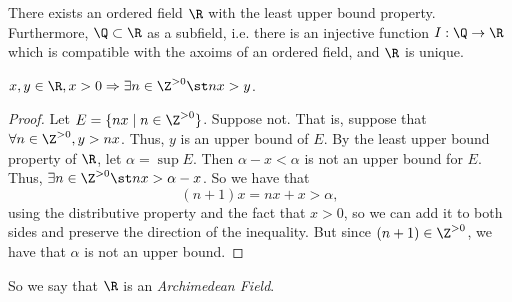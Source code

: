 \documentclass{notes}
\begin{document}
\begin{theorem}
  There exists an ordered field $\R$ with the least upper bound property. Furthermore, $\Q\subset\R$
  as a subfield, i.e. there is an injective function $I:\Q\to\R$ which is compatible with the axoims
  of an ordered field, and $\R$ is unique.
\end{theorem}

\begin{theorem}
  $x,y\in\R, x > 0 \Rightarrow \exists n\in\Z^{>0} \st nx > y$.
\end{theorem}
\begin{proof}
  Let $E = \{nx\mid n\in\Z^{>0}\}$. Suppose not. That is, suppose that $\forall n\in\Z^{>0}, y > nx$. 
  Thus, $y$ is an upper bound of $E$. By the least upper bound property of $\R$, let $\alpha = \sup E$.
  Then $\alpha - x < \alpha$ is not an upper bound for $E$. Thus, $\exists n\in\Z^{>0}\st nx > \alpha
  - x$. So we have that $$(n+1)x = nx + x > \alpha,$$ using the distributive property and the fact that
  $x > 0$, so we can add it to both sides and preserve the direction of the inequality. But since 
  $(n+1)\in\Z^{>0}$, we have that $\alpha$ is not an upper bound. 
\end{proof}
So we say that $\R$ is an \emph{Archimedean Field}.
\end{document}
